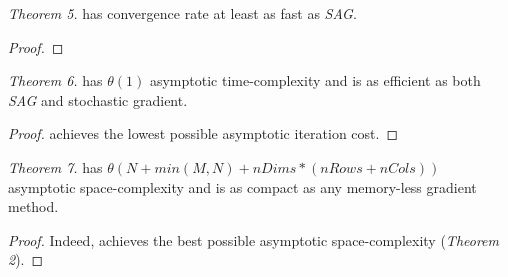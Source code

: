 \emph{Theorem 5.}
\tool has convergence rate at least as fast as \emph{SAG}.
\begin{proof}

\end{proof}


\emph{Theorem 6.}
\tool has $\theta(1)$ asymptotic time-complexity and is as efficient as both \emph{SAG} and stochastic gradient.
\begin{proof}
\tool achieves the lowest possible asymptotic iteration cost.
\end{proof}


\emph{Theorem 7.}
\tool has $\theta(N + min(M,N) + nDims*(nRows+nCols))$ asymptotic space-complexity and is as compact as any memory-less gradient method.
\begin{proof}
Indeed, \tool achieves the best possible asymptotic space-complexity (\emph{Theorem 2}).
\end{proof}
